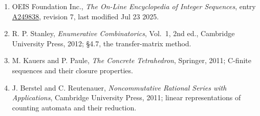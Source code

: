 \documentclass[11pt]{article}
\theoremstyle{definition}
\begin{document}
\begin{enumerate}

\item OEIS Foundation Inc., \emph{The On-Line Encyclopedia of Integer Sequences}, entry \href{https://oeis.org/A249838}{A249838}, revision 7, last modified Jul 23 2025.

\item R. P. Stanley, \emph{Enumerative Combinatorics}, Vol.~1, 2nd ed., Cambridge University Press, 2012; \S4.7, the transfer-matrix method.

\item M. Kauers and P. Paule, \emph{The Concrete Tetrahedron}, Springer, 2011; C-finite sequences and their closure properties.

\item J. Berstel and C. Reutenauer, \emph{Noncommutative Rational Series with Applications}, Cambridge University Press, 2011; linear representations of counting automata and their reduction.

\end{enumerate}
\end{document}
